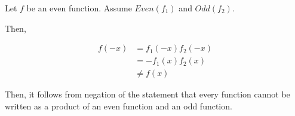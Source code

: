 \documentclass[12pt]{article}
\begin{document}
\begin{enumerate}[a.]
    \bigskip

    Let $f$ be an even function. Assume $Even(f_1)$ and $Odd(f_2)$.

    \bigskip

    Then,

    \begin{align}
        f(-x) &= f_1(-x)f_2(-x)\\
        &= -f_1(x)f_2(x)\\
        &\neq f(x)
    \end{align}

    Then, it follows from negation of the statement that every function cannot be
    written as a product of an even function and an odd function.


\end{enumerate}
\end{document}
